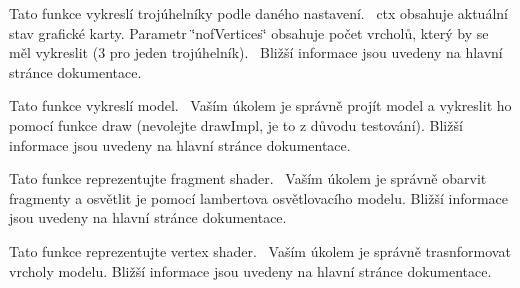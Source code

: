 
\begin{DoxyRefList}
\item[Global \mbox{\hyperlink{gpu_8cpp_ada9d141f30fb8aa83a39a11d23ddf154}{draw\+Impl}} (\mbox{\hyperlink{structGPUContext}{G\+P\+U\+Context}} \&ctx, uint32\+\_\+t nof\+Vertices)]\label{todo__todo000004}%
%
Tato funkce vykreslí trojúhelníky podle daného nastavení.~\newline
 ctx obsahuje aktuální stav grafické karty. Parametr \char`\"{}nof\+Vertices\char`\"{} obsahuje počet vrcholů, který by se měl vykreslit (3 pro jeden trojúhelník).~\newline
 Bližší informace jsou uvedeny na hlavní stránce dokumentace.  
\item[Global \mbox{\hyperlink{drawModel_8hpp_ac14f542e0c0210cb47b47abcfa2fc279}{draw\+Model}} (\mbox{\hyperlink{structGPUContext}{G\+P\+U\+Context}} \&ctx, \mbox{\hyperlink{structModel}{Model}} const \&model, glm\+::mat4 const \&proj, glm\+::mat4 const \&view, glm\+::vec3 const \&light, glm\+::vec3 const \&camera)]\label{todo__todo000001}%
%
Tato funkce vykreslí model.~\newline
 Vaším úkolem je správně projít model a vykreslit ho pomocí funkce draw (nevolejte draw\+Impl, je to z důvodu testování). Bližší informace jsou uvedeny na hlavní stránce dokumentace.  
\item[Global \mbox{\hyperlink{drawModel_8hpp_a00d11e84945ed4f7699102c077328bd0}{draw\+Model\+\_\+fragment\+Shader}} (\mbox{\hyperlink{structOutFragment}{Out\+Fragment}} \&out\+Fragment, \mbox{\hyperlink{structInFragment}{In\+Fragment}} const \&in\+Fragment, \mbox{\hyperlink{structUniforms}{Uniforms}} const \&uniforms)]\label{todo__todo000003}%
%
Tato funkce reprezentujte fragment shader.~\newline
 Vaším úkolem je správně obarvit fragmenty a osvětlit je pomocí lambertova osvětlovacího modelu. Bližší informace jsou uvedeny na hlavní stránce dokumentace.  
\item[Global \mbox{\hyperlink{drawModel_8hpp_af28c26a23a26d8bb27f8a24833037c3c}{draw\+Model\+\_\+vertex\+Shader}} (\mbox{\hyperlink{structOutVertex}{Out\+Vertex}} \&out\+Vertex, \mbox{\hyperlink{structInVertex}{In\+Vertex}} const \&in\+Vertex, \mbox{\hyperlink{structUniforms}{Uniforms}} const \&uniforms)]\label{todo__todo000002}%
%
Tato funkce reprezentujte vertex shader.~\newline
 Vaším úkolem je správně trasnformovat vrcholy modelu. Bližší informace jsou uvedeny na hlavní stránce dokumentace. 
\end{DoxyRefList}